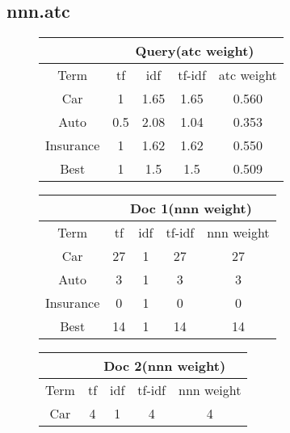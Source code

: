 \documentclass[11pt]{article}
\begin{document}
\subsection*{nnn.atc}
\begin{figure}[H]
  \begin{minipage}{0.5\linewidth}
    \begin{table}[H]
      \centering
      \begin{tabular}{|c|c|c|c|c|} \hline
        & \multicolumn{4}{|c|}{Query(atc weight)}\\ \hline
        Term         & tf& idf  & tf-idf & atc weight \\ \hline
        Car          & 1 & 1.65 & 1.65& 0.560 \\ \hline
        Auto         & 0.5 & 2.08 & 1.04& 0.353 \\ \hline
        Insurance    & 1 & 1.62 & 1.62& 0.550\\ \hline
        Best         & 1 & 1.5  & 1.5 & 0.509\\ \hline
      \end{tabular}
    \end{table}
  \end{minipage}
  \begin{minipage}{0.5\linewidth}
    \begin{table}[H]
      \centering
      \begin{tabular}{|c|c|c|c|c|} \hline
        & \multicolumn{4}{|c|}{Doc 1(nnn weight)}\\ \hline
        Term     & tf & idf & tf-idf & nnn weight \\ \hline
        Car      & 27 &1& 27& 27 \\ \hline
        Auto     & 3  &1& 3& 3\\ \hline
        Insurance& 0  &1& 0& 0\\ \hline
        Best     & 14 &1& 14& 14\\ \hline
      \end{tabular}
    \end{table}
  \end{minipage}
  \begin{minipage}{0.5\linewidth}
    \begin{table}[H]
      \centering
      \begin{tabular}{|c|c|c|c|c|} \hline
        & \multicolumn{4}{|c|}{Doc 2(nnn weight)}\\ \hline
        Term     & tf & idf & tf-idf & nnn weight \\ \hline
        Car      & 4  &1    & 4 & 4 \\ \hline

\end{tabular}
\end{table}
\end{minipage}
\end{figure}
\end{document}
